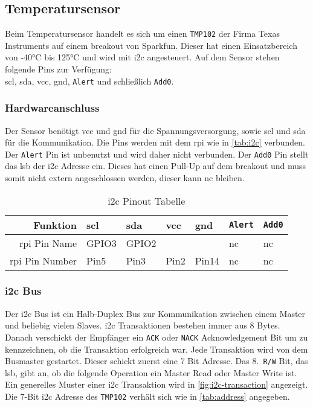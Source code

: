 \subsection{Temperatursensor}

Beim Temperatursensor handelt es sich um einen \texttt{TMP102} der Firma Texas Instruments auf einem \gls{breakout} von Sparkfun.
Dieser hat einen Einsatzbereich von -40\si{\celsius} bis 125\si{\celsius} und wird mit \gls{i2c} angesteuert.
Auf dem Sensor stehen folgende Pins zur Verfügung: \\
\gls{scl}, \gls{sda}, \gls{vcc}, \gls{gnd}, \texttt{Alert} und schließlich \texttt{Add0}.

\subsubsection{Hardwareanschluss}

Der Sensor benötigt \gls{vcc} und \gls{gnd} für die Spannungsversorgung, sowie \gls{scl} und \gls{sda} für die Kommunikation.
Die Pins werden mit dem \gls{rpi} wie in \autoref{tab:i2c} verbunden.
Der \texttt{Alert} Pin ist unbenutzt und wird daher nicht verbunden.
Der \texttt{Add0} Pin stellt das \gls{lsb} der \gls{i2c} Adresse ein.
Dieses hat einen Pull-Up auf dem \gls{breakout} und muss somit nicht extern angeschlossen werden, dieser kann \gls{nc} bleiben.

\begin{table}[h]
    \centering
    \begin{tabular}{|r||l|l|l|l|l|l|}
        \hline
        \textbf{Funktion} & \textbf{\gls{scl}} & \textbf{\gls{sda}} & \textbf{\gls{vcc}} & \textbf{\gls{gnd}} & \textbf{\texttt{Alert}} & \textbf{\texttt{Add0}}\\
        \hline
        \hline
        \gls{rpi} Pin Name & GPIO3 & GPIO2 & & & \gls{nc} & \gls{nc} \\
        \hline
        \gls{rpi} Pin Number & Pin5 & Pin3 & Pin2 & Pin14 & \gls{nc} & \gls{nc} \\
        \hline
    \end{tabular}
    \caption{\gls{i2c} Pinout Tabelle}
    \label{tab:i2c}
\end{table}

\subsubsection{\acrshort{i2c} Bus}

Der \gls{i2c} Bus ist ein Halb-Duplex Bus zur Kommunikation zwischen einem Master und beliebig vielen Slaves.
\gls{i2c} Transaktionen bestehen immer aus 8 Bytes.
Danach verschickt der Empfänger ein \texttt{ACK} oder \texttt{NACK} Acknowledgement Bit um zu kennzeichnen, ob die Transaktion erfolgreich war.
Jede Transaktion wird von dem Busmaster gestartet.
Dieser schickt zuerst eine 7 Bit Adresse.
Das 8.\ \texttt{R/W} Bit, das \gls{lsb}, gibt an, ob die folgende Operation ein Master Read oder Master Write ist.
Ein generelles Muster einer \gls{i2c} Transaktion wird in \autoref{fig:i2c-transaction} angezeigt.
Die $7$-Bit \gls{i2c} Adresse des \texttt{TMP102} verhält sich wie in \autoref{tab:address} angegeben.

